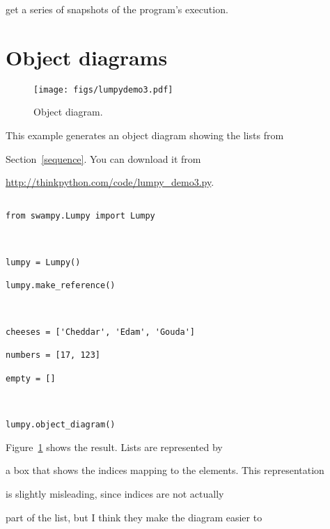 get a series of snapshots of the program's execution.






\section{Object diagrams}



\begin{figure}

\centerline

{\texttt{[image: figs/lumpydemo3.pdf]}}

\caption{Object diagram.}

\label{fig.lumpy3}

\end{figure}



This example generates an object diagram showing the lists from

Section~\ref{sequence}.  You can download it from

\url{http://thinkpython.com/code/lumpy_demo3.py}.

 



\begin{verbatim}

from swampy.Lumpy import Lumpy



lumpy = Lumpy()

lumpy.make_reference()



cheeses = ['Cheddar', 'Edam', 'Gouda']

numbers = [17, 123]

empty = []



lumpy.object_diagram()

\end{verbatim}



Figure~\ref{fig.lumpy3} shows the result.  Lists are represented by

a box that shows the indices mapping to the elements.  This representation

is slightly misleading, since indices are not actually

part of the list, but I think they make the diagram easier to

